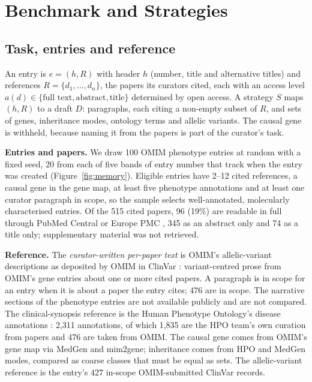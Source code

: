 \documentclass{article} %
\begin{document}
\section{Benchmark and Strategies}
\label{sec:method}
\subsection{Task, entries and reference}
\label{sec:task}
An entry is $e=(h,R)$ with header $h$ (number, title and alternative titles) and references $R=\{d_1,\dots,d_n\}$, the papers its curators cited, each with an access level $a(d)\in\{\text{full text},\text{abstract},\text{title}\}$ determined by open access. A strategy $S$ maps $(h,R)$ to a draft $D$: paragraphs, each citing a non-empty subset of $R$, and sets of genes, inheritance modes, ontology terms and allelic variants. The causal gene is withheld, because naming it from the papers is part of the curator's task.

\textbf{Entries and papers.} We draw 100 OMIM phenotype entries at random with a fixed seed, 20 from each of five bands of entry number that track when the entry was created (Figure~\ref{fig:memory}). Eligible entries have 2--12 cited references, a causal gene in the gene map, at least five phenotype annotations and at least one curator paragraph in scope, so the sample selects well-annotated, molecularly characterised entries. Of the 515 cited papers, 96 (19\%) are readable in full through PubMed Central or Europe PMC \citep{rosonovski2024europe}, 345 as an abstract only and 74 as a title only; supplementary material was not retrieved.

\textbf{Reference.} The \emph{curator-written per-paper text} is OMIM's allelic-variant descriptions as deposited by OMIM in ClinVar \citep{landrum2025clinvar}: variant-centred prose from OMIM's gene entries about one or more cited papers. A paragraph is in scope for an entry when it is about a paper the entry cites; 476 are in scope. The narrative sections of the phenotype entries are not available publicly and are not compared. The clinical-synopsis reference is the Human Phenotype Ontology's disease annotations \citep{gargano2024human}: 2,311 annotations, of which 1,835 are the HPO team's own curation from papers and 476 are taken from OMIM. The causal gene comes from OMIM's gene map via MedGen \citep{Louden2020MedgenNcbis} and mim2gene; inheritance comes from HPO and MedGen modes, compared as coarse classes that must be equal as sets. The allelic-variant reference is the entry's 427 in-scope OMIM-submitted ClinVar records.
\end{document}
